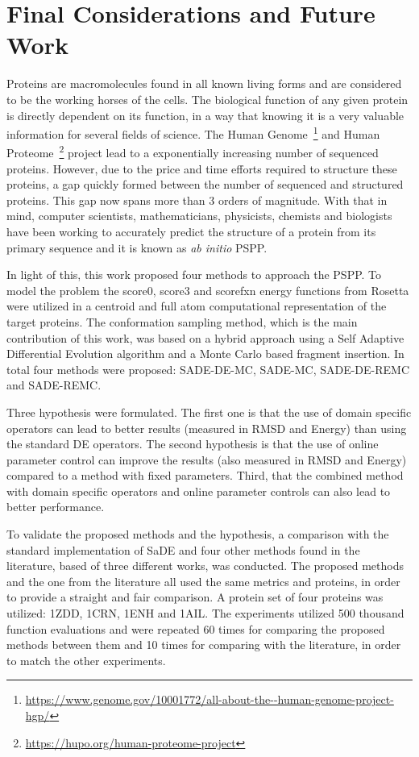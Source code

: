 \chapter{Final Considerations and Future Work}\label{chap:final_considerations}

Proteins are macromolecules found in all known living forms and are
considered to be the working horses of the cells. The biological
function of any given protein is directly dependent on its
function, in a way that knowing it is a very valuable information
for several fields of science. The Human
Genome~\footnote{\url{https://www.genome.gov/10001772/all-about-the--human-genome-project-hgp/}}
and Human Proteome~\footnote{\url{https://hupo.org/human-proteome-project}} project
lead to a exponentially increasing number of sequenced proteins.
However, due to the price and time efforts required to structure
these proteins, a gap quickly formed between the number of sequenced
and structured proteins. This gap now spans more than 3 orders
of magnitude. With that in mind, computer scientists, mathematicians,
physicists, chemists and biologists have been working to accurately
predict the structure of a protein from its primary
sequence and it is known as \textit{ab initio} PSPP.

In light of this, this work proposed four methods to
approach the PSPP. To model the problem the score0, score3 and scorefxn energy functions from Rosetta were utilized in a centroid
and full atom computational representation of the target proteins.
The conformation sampling method, which is the main contribution
of this work, was based on a hybrid approach using a
Self Adaptive Differential Evolution algorithm and a Monte Carlo
based fragment insertion. In total four methods were proposed:
SADE-DE-MC, SADE-MC, SADE-DE-REMC and SADE-REMC.

Three hypothesis were formulated. The first one is that the use of domain specific
operators can lead to better results (measured in RMSD and Energy) than using
the standard DE operators. The second hypothesis is that the use of online parameter
control can improve the results (also measured in RMSD and Energy) compared to
a method with fixed parameters. Third, that the combined method with
domain specific operators and online parameter controls can also lead to better performance.

To validate the proposed methods and the hypothesis, a comparison with the
standard implementation of SaDE and four other methods found in the
literature, based of three different works, was conducted. The proposed methods
and the one from the literature all used the same metrics and proteins, in order to provide a straight and fair comparison. A protein set of four proteins was utilized: 1ZDD, 1CRN, 1ENH and 1AIL. The experiments utilized 500 thousand function evaluations and
were repeated 60 times for comparing the proposed methods between them and 10 times for comparing with the literature, in order to match the other experiments.

